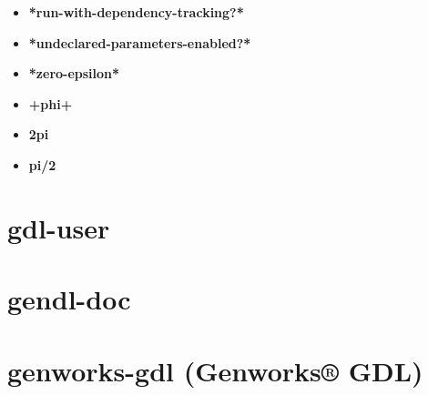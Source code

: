 \documentclass [11pt]{book}
\begin{document}
\begin{itemize}
\item {}
\label{prim:*run-with-dependency-tracking?*}
\textbf{*run-with-dependency-tracking?*}





\item {}
\label{prim:*undeclared-parameters-enabled?*}
\textbf{*undeclared-parameters-enabled?*}





\item {}
\label{prim:*zero-epsilon*}
\textbf{*zero-epsilon*}





\item {}
\label{prim:+phi+}
\textbf{+phi+}





\item {}
\label{prim:2pi}
\textbf{2pi}





\item {}
\label{prim:pi/2}
\textbf{pi/2}





\end{itemize}





\section{gdl-user }

\label{sec:gdl-user}







\section{gendl-doc }

\label{sec:gendl-doc}







\section{genworks-gdl (Genworks® GDL)}
\end{document}
